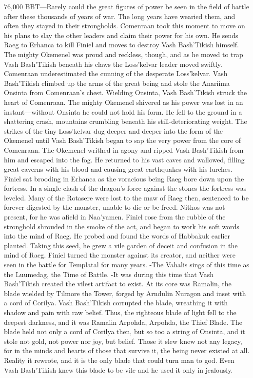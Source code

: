 \documentclass[smalldemyvopaper,11pt,twoside,onecolumn,openright,extrafontsizes]{memoir}
\begin{document}
76,000 BBT—Rarely could the great figures of power be seen in the field of battle after these thousands of years of war. The long years have wearied them, and often they stayed in their strongholds. Comenraan took this moment to move on his plans to slay the other leaders and claim their power for his own. He sends Raeg to Erhanca to kill Finiel and moves to destroy Vash Bash’Tikish himself. The mighty Okemenel was proud and reckless, though, and as he moved to trap Vash Bash’Tikish beneath his claws the Loss’kelvar leader moved swiftly. Comenraan underestimated the cunning of the desperate Loss’kelvar. Vash Bash’Tikish climbed up the arms of the great being and stole the Anariima Onsinta from Comenraan’s chest. Wielding Onsinta, Vash Bash’Tikish struck the heart of Comenraan. The mighty Okemenel shivered as his power was lost in an instant—without Onsinta he could not hold his form. He fell to the ground in a shattering crash, mountains crumbling beneath his still-deteriorating weight. The strikes of the tiny Loss’kelvar dug deeper and deeper into the form of the Okemenel until Vash Bash’Tikish began to sap the very power from the core of Comenraan. The Okemenel writhed in agony and ripped Vash Bash’Tikish from him and escaped into the fog. He returned to his vast caves and wallowed, filling great caverns with his blood and causing great earthquakes with his lurches.
	Finiel sat brooding in Erhanca as the voracious being Raeg bore down upon the fortress. In a single clash of the dragon’s force against the stones the fortress was leveled. Many of the Rotasere were lost to the maw of Raeg then, sentenced to be forever digested by the monster, unable to die or be freed. Nithos was not present, for he was afield in Naa’yamen. Finiel rose from the rubble of the stronghold shrouded in the smoke of the act, and began to work his soft words into the mind of Raeg. He probed and found the words of Habbakuk earlier planted. Taking this seed, he grew a vile garden of deceit and confusion in the mind of Raeg. Finiel turned the monster against its creator, and neither were seen in the battle for Templatal for many years.
	-The Vahalis sings of this time as the Luumedag, the Time of Battle.
-It was during this time that Vash Bash’Tikish created the vilest artifact to exist. At its core was Ramalin, the blade wielded by Tilmore the Tower, forged by Arndulin Nuragon and inset with a cord of Corilya. Vash Bash’Tikish corrupted the blade, wreathing it with shadow and pain with raw belief. Thus, the righteous blade of light fell to the deepest darkness, and it was Ramalin Arpohda, Arpohda, the Thief Blade. The blade held not only a cord of Corilya then, but so too a string of Onsinta, and it stole not gold, not power nor joy, but belief. Those it slew knew not any legacy, for in the minds and hearts of those that survive it, the being never existed at all. Reality it rewrote, and it is the only blade that could turn man to god. Even Vash Bash’Tikish knew this blade to be vile and he used it only in jealously.
\end{document}
